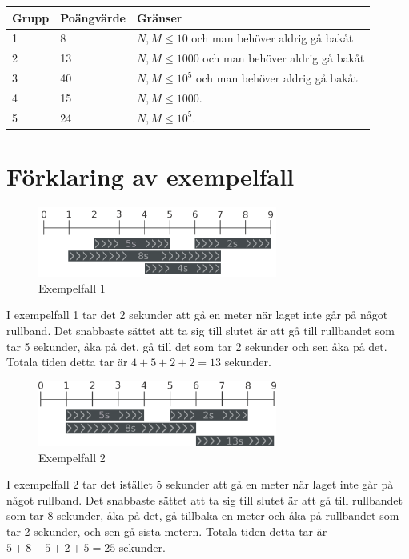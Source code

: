 \noindent
\begin{tabular}{| l | l | l |}
\hline
Grupp & Poängvärde & Gränser \\ \hline
1     & 8          &  $N,M \le 10$ och man behöver aldrig gå bakåt\\ \hline
2     & 13         &  $N,M \le 1000$ och man behöver aldrig gå bakåt\\ \hline
3     & 40         &  $N,M \le 10^5$ och man behöver aldrig gå bakåt\\ \hline
4     & 15         &  $N,M \le 1000$. \\ \hline
5     & 24         &  $N,M \le 10^5$. \\ \hline
\end{tabular}

\section*{Förklaring av exempelfall}

\begin{figure}[h]
	\centering
\includegraphics[width=0.7\textwidth]{sample1}
\caption{Exempelfall 1}
\end{figure}
I exempelfall 1 tar det 2 sekunder att gå en meter när laget inte går på något rullband.
Det snabbaste sättet att ta sig till slutet är att gå till rullbandet som
tar 5 sekunder, åka på det, gå till det som tar 2 sekunder och sen åka på det.
Totala tiden detta tar är $4+5+2+2=13$ sekunder.



\begin{figure}[h]
	\centering
\includegraphics[width=0.7\textwidth]{sample2}
\caption{Exempelfall 2}
\end{figure}
I exempelfall 2 tar det istället 5 sekunder att gå en meter när laget inte går på något rullband.
Det snabbaste sättet att ta sig till slutet är att gå till rullbandet som
tar 8 sekunder, åka på det, gå tillbaka en meter och åka på
rullbandet som tar 2 sekunder, och sen gå sista metern.
Totala tiden detta tar är $5+8+5+2+5=25$ sekunder.
